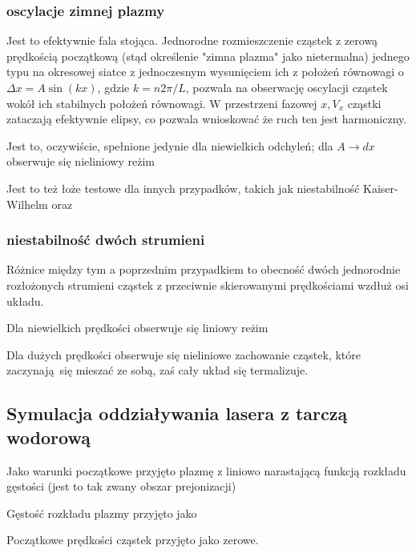     \subsubsection{oscylacje zimnej plazmy}
    Jest to efektywnie fala stojąca. Jednorodne rozmieszczenie cząstek z zerową prędkością początkową (stąd określenie
    "zimna plazma" jako nietermalna)
    jednego typu na okresowej siatce z jednoczesnym wysunięciem ich z położeń równowagi o $\Delta x = A \sin(kx)$,
    gdzie $k = n 2 \pi / L$, pozwala na obserwację
    oscylacji cząstek wokół ich stabilnych położeń równowagi. W przestrzeni fazowej $x, V_x$ cząstki zataczają efektywnie
    elipsy, co pozwala wnioskować że ruch ten jest harmoniczny.

    Jest to, oczywiście, spełnione jedynie dla niewielkich odchyleń; dla $A \to dx$ 
    obserwuje się nieliniowy reżim 

    Jest to też łoże testowe 
    dla innych przypadków, takich jak niestabilność Kaiser-Wilhelm 
    oraz 
    \subsubsection{niestabilność dwóch strumieni} 
    Różnice między tym a poprzednim przypadkiem to obecność dwóch jednorodnie rozłożonych strumieni cząstek
    z przeciwnie skierowanymi prędkościami wzdłuż osi układu.

    Dla niewielkich prędkości 
    obserwuje się liniowy reżim 

    Dla dużych prędkości 
     obserwuje się nieliniowe zachowanie cząstek, które zaczynają się mieszać ze sobą, zaś cały układ się termalizuje.
    \subsection{Symulacja oddziaływania lasera z tarczą wodorową}

    Jako warunki początkowe przyjęto plazmę z liniowo narastającą funkcją rozkładu gęstości (jest to tak zwany obszar prejonizacji) 

    Gęstość rozkładu plazmy przyjęto jako

    Początkowe prędkości cząstek przyjęto jako zerowe. 

